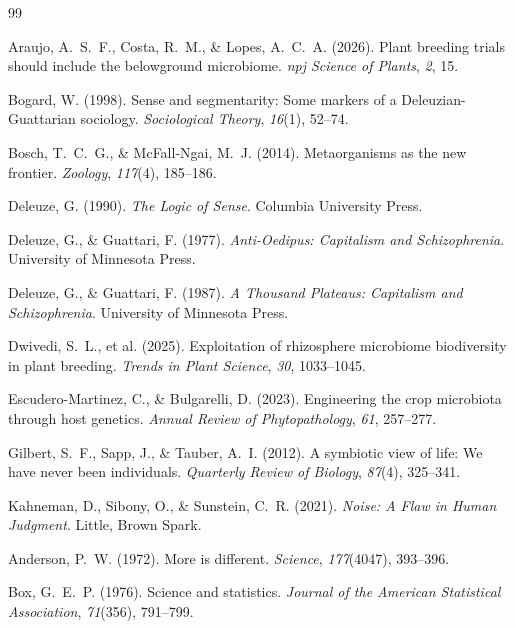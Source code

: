 \documentclass[11pt, a4paper]{article}
\begin{document}

\begin{thebibliography}{99}

Araujo, A.~S.~F., Costa, R.~M., \& Lopes, A.~C.~A. (2026). Plant breeding trials should include the belowground microbiome. \textit{npj Science of Plants}, \textit{2}, 15.

Bogard, W. (1998). Sense and segmentarity: Some markers of a Deleuzian-Guattarian sociology. \textit{Sociological Theory}, \textit{16}(1), 52--74.

Bosch, T.~C.~G., \& McFall-Ngai, M.~J. (2014). Metaorganisms as the new frontier. \textit{Zoology}, \textit{117}(4), 185--186.

Deleuze, G. (1990). \textit{The Logic of Sense}. Columbia University Press.

Deleuze, G., \& Guattari, F. (1977). \textit{Anti-Oedipus: Capitalism and Schizophrenia}. University of Minnesota Press.

Deleuze, G., \& Guattari, F. (1987). \textit{A Thousand Plateaus: Capitalism and Schizophrenia}. University of Minnesota Press.

Dwivedi, S.~L., et al. (2025). Exploitation of rhizosphere microbiome biodiversity in plant breeding. \textit{Trends in Plant Science}, \textit{30}, 1033--1045.

Escudero-Martinez, C., \& Bulgarelli, D. (2023). Engineering the crop microbiota through host genetics. \textit{Annual Review of Phytopathology}, \textit{61}, 257--277.

Gilbert, S.~F., Sapp, J., \& Tauber, A.~I. (2012). A symbiotic view of life: We have never been individuals. \textit{Quarterly Review of Biology}, \textit{87}(4), 325--341.

Kahneman, D., Sibony, O., \& Sunstein, C.~R. (2021). \textit{Noise: A Flaw in Human Judgment}. Little, Brown Spark.

Anderson, P.~W. (1972). More is different. \textit{Science}, \textit{177}(4047), 393--396.

Box, G.~E.~P. (1976). Science and statistics. \textit{Journal of the American Statistical Association}, \textit{71}(356), 791--799.


\end{thebibliography}
\end{document}
